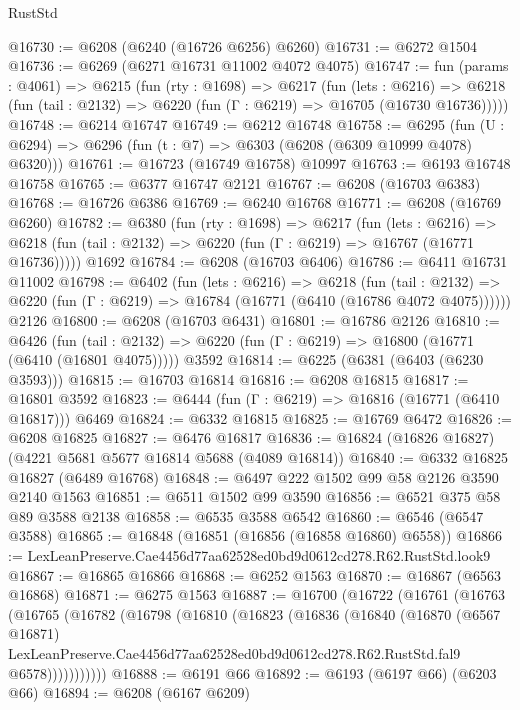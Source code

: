 \begin{lexlean}{RustStd}
\begin{coremodule}
@16730 := @6208 (@6240 (@16726 @6256) @6260)
@16731 := @6272 @1504
@16736 := @6269 (@6271 @16731 @11002 @4072 @4075)
@16747 := fun (params : @4061) =>
  @6215
    (fun (rty : @1698) =>
    @6217
      (fun (lets : @6216) =>
      @6218 (fun (tail : @2132) => @6220 (fun (Γ : @6219) => @16705 (@16730 @16736)))))
@16748 := @6214 @16747
@16749 := @6212 @16748
@16758 := @6295
    (fun (U : @6294) => @6296 (fun (t : @7) => @6303 (@6208 (@6309 @10999 @4078) @6320)))
@16761 := @16723 (@16749 @16758) @10997
@16763 := @6193 @16748 @16758
@16765 := @6377 @16747 @2121
@16767 := @6208 (@16703 @6383)
@16768 := @16726 @6386
@16769 := @6240 @16768
@16771 := @6208 (@16769 @6260)
@16782 := @6380
    (fun (rty : @1698) =>
    @6217
      (fun (lets : @6216) =>
      @6218 (fun (tail : @2132) => @6220 (fun (Γ : @6219) => @16767 (@16771 @16736)))))
    @1692
@16784 := @6208 (@16703 @6406)
@16786 := @6411 @16731 @11002
@16798 := @6402
    (fun (lets : @6216) =>
    @6218
      (fun (tail : @2132) =>
      @6220 (fun (Γ : @6219) => @16784 (@16771 (@6410 (@16786 @4072 @4075))))))
    @2126
@16800 := @6208 (@16703 @6431)
@16801 := @16786 @2126
@16810 := @6426
    (fun (tail : @2132) => @6220 (fun (Γ : @6219) => @16800 (@16771 (@6410 (@16801 @4075)))))
    @3592
@16814 := @6225 (@6381 (@6403 (@6230 @3593)))
@16815 := @16703 @16814
@16816 := @6208 @16815
@16817 := @16801 @3592
@16823 := @6444 (fun (Γ : @6219) => @16816 (@16771 (@6410 @16817))) @6469
@16824 := @6332 @16815
@16825 := @16769 @6472
@16826 := @6208 @16825
@16827 := @6476 @16817
@16836 := @16824 (@16826 @16827) (@4221 @5681 @5677 @16814 @5688 (@4089 @16814))
@16840 := @6332 @16825 @16827 (@6489 @16768)
@16848 := @6497 @222 @1502 @99 @58 @2126 @3590 @2140 @1563
@16851 := @6511 @1502 @99 @3590
@16856 := @6521 @375 @58 @89 @3588 @2138
@16858 := @6535 @3588 @6542
@16860 := @6546 (@6547 @3588)
@16865 := @16848 (@16851 (@16856 (@16858 @16860) @6558))
@16866 := LexLeanPreserve.Cae4456d77aa62528ed0bd9d0612cd278.R62.RustStd.look9
@16867 := @16865 @16866
@16868 := @6252 @1563
@16870 := @16867 (@6563 @16868)
@16871 := @6275 @1563
@16887 := @16700
    (@16722
      (@16761
        (@16763
          (@16765
            (@16782
              (@16798
                (@16810
                  (@16823
                    (@16836
                      (@16840
                        (@16870
                          (@6567 @16871)
                          LexLeanPreserve.Cae4456d77aa62528ed0bd9d0612cd278.R62.RustStd.fal9
                          @6578)))))))))))
@16888 := @6191 @66
@16892 := @6193 (@6197 @66) (@6203 @66)
@16894 := @6208 (@6167 @6209)

\end{coremodule}
\end{lexlean}
